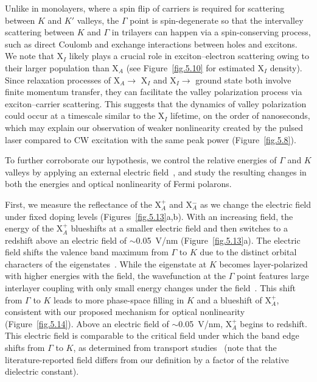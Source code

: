 Unlike in monolayers, where a spin flip of carriers is required for scattering between $K$ and $K'$ valleys, the $\Gamma$ point is spin-degenerate so that the intervalley scattering between $K$ and $\Gamma$ in trilayers can happen via a spin-conserving process, such as direct Coulomb and exchange interactions between holes and excitons. 
We note that X$_I$ likely plays a crucial role in exciton--electron scattering owing to their larger population than X$_A$ (see Figure~\ref{fig.5.10} for estimated X$_I$ density). 
Since relaxation processes of X$_A \rightarrow$ X$_I$ and X$_I \rightarrow$ ground state both involve finite momentum transfer, they can facilitate the valley polarization process via exciton--carrier scattering. 
This suggests that the dynamics of valley polarization could occur at a timescale similar to the X$_I$ lifetime, on the order of nanoseconds, which may explain our observation of weaker nonlinearity created by the pulsed laser compared to CW excitation with the same peak power (Figure~\ref{fig.5.8}).

To further corroborate our hypothesis, we control the relative energies of $\Gamma$ and $K$ valleys by applying an external electric field~\cite{Wang2018-pz,Movva2018-mu}, and study the resulting changes in both the energies and optical nonlinearity of Fermi polarons. 

First, we measure the reflectance of the X$_A^+$ and X$_A^-$ as we change the electric field under fixed doping levels (Figures~\ref{fig.5.13}a,b). 
With an increasing field, the energy of the X$_A^+$ blueshifts at a smaller electric field and then switches to a redshift above an electric field of $\sim$0.05~V/nm (Figure~\ref{fig.5.13}a). 
The electric field shifts the valence band maximum from $\Gamma$ to $K$ due to the distinct orbital characters of the eigenstates~\cite{Movva2018-mu}. 
While the eigenstate at $K$ becomes layer-polarized with higher energies with the field, the wavefunction at the $\Gamma$ point features large interlayer coupling with only small energy changes under the field~\cite{Movva2018-mu}.
This shift from $\Gamma$ to $K$ leads to more phase-space filling in $K$ and a blueshift of X$_A^+$, consistent with our proposed mechanism for optical nonlinearity (Figure~\ref{fig.5.14}). 
Above an electric field of $\sim$0.05~V/nm, X$_A^+$ begins to redshift. 
This electric field is comparable to the critical field under which the band edge shifts from $\Gamma$ to $K$, as determined from transport studies~\cite{Movva2018-mu} (note that the literature-reported field differs from our definition by a factor of the relative dielectric constant). 

